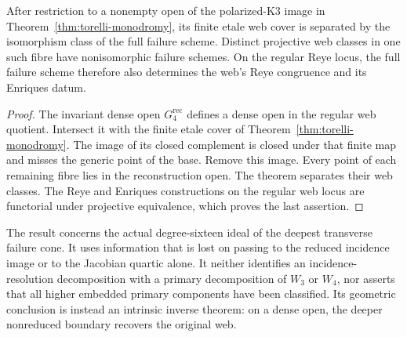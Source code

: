 \begin{corollary}
\label{cor:separate-torelli-packet}
After restriction to a nonempty open of the polarized-K3 image in
Theorem~\ref{thm:torelli-monodromy}, its finite etale web cover is
separated by the isomorphism class of the full failure scheme.
Distinct projective web classes in one such fibre have nonisomorphic
failure schemes.  On the regular Reye locus, the full failure scheme
therefore also determines the web's Reye congruence and its Enriques
datum.
\end{corollary}
\begin{proof}
The invariant dense open \(G_4^{\mathrm{rec}}\) defines a dense
open in the regular web quotient.  Intersect it with the finite etale
cover of Theorem~\ref{thm:torelli-monodromy}.  The image of its
closed complement is closed under that finite map and misses the
generic point of the base.  Remove this image.  Every point of each
remaining fibre lies in the reconstruction open.  The theorem
separates their web classes.  The Reye and Enriques constructions on
the regular web locus are functorial under projective equivalence,
which proves the last assertion.
\end{proof}

The result concerns the actual degree-sixteen ideal of the deepest
transverse failure cone.  It uses information that is lost on passing
to the reduced incidence image or to the Jacobian quartic alone.
It neither identifies an incidence-resolution decomposition with a
primary decomposition of \(W_3\) or \(W_4\), nor asserts that
all higher embedded primary components have been classified.  Its
geometric conclusion is instead an intrinsic inverse theorem: on a
dense open, the deeper nonreduced boundary recovers the original web.


